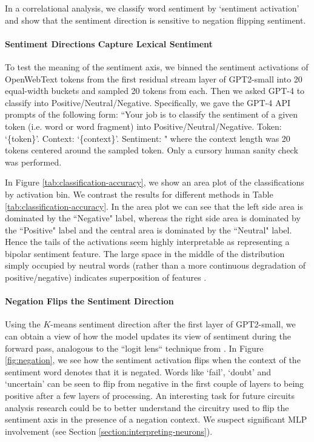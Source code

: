 \documentclass{article} %
\newcommand{\owtNbins}{20 }
\newcommand{\owtNsamples}{20 }
\newcommand{\owtNcontext}{20 }
\begin{document}
In a correlational analysis, we classify word sentiment by `sentiment activation' and show that the sentiment direction is sensitive to negation flipping sentiment.

\paragraph{Sentiment Directions Capture Lexical Sentiment} To test the meaning of the sentiment axis, we binned the sentiment activations of OpenWebText tokens from the first residual stream layer of GPT2-small into \owtNbins equal-width buckets and sampled \owtNsamples tokens from each. Then we asked GPT-4 to classify into Positive/Neutral/Negative. Specifically, we gave the GPT-4 API prompts of the following form: ``Your job is to classify the sentiment of a given token (i.e. word or word fragment) into Positive/Neutral/Negative. Token: `\{token\}'. Context: `\{context\}'. Sentiment:  " where the context length was \owtNcontext tokens centered around the sampled token. Only a cursory human sanity check was performed.



In Figure \ref{tab:classification-accuracy}, we show an area plot of the classifications by activation bin. We contrast the results for different methods in Table \ref{tab:classification-accuracy}. In the area plot we can see that the left side area is dominated by the ``Negative" label, whereas the right side area is dominated by the ``Positive" label and the central area is dominated by the ``Neutral" label. Hence the tails of the activations seem highly interpretable as representing a bipolar sentiment feature. The large space in the middle of the distribution simply occupied by neutral words (rather than a more continuous degradation of positive/negative) indicates superposition of features \citep{elhage2022superposition}. 

\paragraph{Negation Flips the Sentiment Direction} Using the $K$-means sentiment direction after the first layer of GPT2-small, we can obtain a view of how the model updates its view of sentiment during the forward pass, analogous to the ``logit lens`` technique from \cite{logit_lens}. In Figure \ref{fig:negation}, we see how the sentiment activation flips when the context of the sentiment word denotes that it is negated. Words like `fail', `doubt' and `uncertain' can be seen to flip from negative in the first couple of layers to being positive after a few layers of processing. An interesting task for future circuits analysis research could be to better understand the circuitry used to flip the sentiment axis in the presence of a negation context. We suspect significant MLP involvement (see Section \ref{section:interpreting-neurons}).
\end{document}
